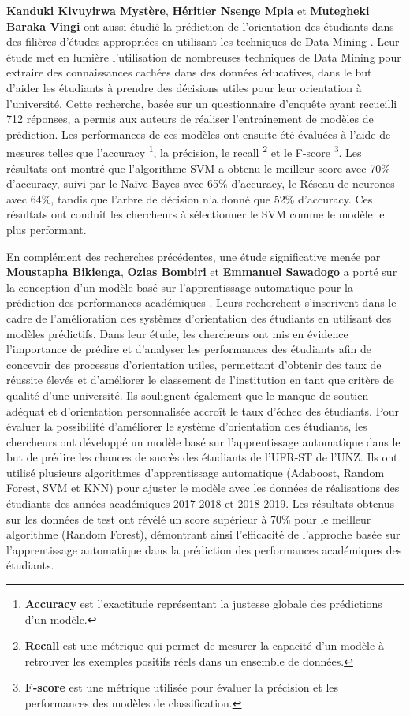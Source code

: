 \textbf{Kanduki Kivuyirwa Mystère}, \textbf{Héritier Nsenge Mpia} et \textbf{Mutegheki Baraka Vingi} ont aussi étudié la prédiction de l'orientation des étudiants dans des filières d’études appropriées en utilisant les techniques de Data Mining \cite{mystere2023prediction}. Leur étude met en lumière l'utilisation de nombreuses techniques de Data Mining pour extraire des connaissances cachées dans des données éducatives, dans le but d'aider les étudiants à prendre des décisions utiles pour leur orientation à l’université.
Cette recherche, basée sur un questionnaire d'enquête ayant recueilli 712 réponses, a permis aux auteurs de réaliser l'entraînement de modèles de prédiction. Les performances de ces modèles ont ensuite été évaluées à l'aide de mesures telles que l'accuracy \textsuperscript{} \footnote{\textbf{Accuracy} est l’exactitude représentant la justesse globale des prédictions d’un modèle.}, la précision, le recall \textsuperscript{} \footnote{\textbf{Recall} est une métrique qui permet de mesurer la capacité d’un modèle à retrouver les exemples positifs réels dans un ensemble de données.} et le F-score\textsuperscript{} \footnote{\textbf{F-score} est une métrique utilisée pour évaluer la précision et les performances des modèles de classification.}. Les résultats ont montré que l'algorithme SVM a obtenu le meilleur score avec 70\% d’accuracy, suivi par le Naïve Bayes avec 65\% d’accuracy, le Réseau de neurones avec 64\%, tandis que l’arbre de décision n'a donné que 52\% d’accuracy. Ces résultats ont conduit les chercheurs à sélectionner le SVM comme le modèle le plus performant.

En complément des recherches précédentes, une étude significative menée par \textbf{Moustapha Bikienga}, \textbf{Ozias Bombiri} et \textbf{Emmanuel Sawadogo} a porté sur la conception d'un modèle basé sur l'apprentissage automatique pour la prédiction des performances académiques \cite{bikienga2023design}. Leurs recherchent s'inscrivent dans le cadre de l'amélioration des systèmes d'orientation des étudiants en utilisant des modèles prédictifs.
Dans leur étude, les chercheurs ont mis en évidence l'importance de prédire et d'analyser les performances des étudiants afin de concevoir des processus d'orientation utiles, permettant d'obtenir des taux de réussite élevés et d'améliorer le classement de l'institution en tant que critère de qualité d'une université. Ils soulignent également que le manque de soutien adéquat et d'orientation personnalisée accroît le taux d'échec des étudiants.
Pour évaluer la possibilité d'améliorer le système d'orientation des étudiants, les chercheurs ont développé un modèle basé sur l'apprentissage automatique dans le but de prédire les chances de succès des étudiants de l'UFR-ST de l'UNZ. Ils ont utilisé plusieurs algorithmes d'apprentissage automatique (Adaboost, Random Forest, SVM et KNN) pour ajuster le modèle avec les données de réalisations des étudiants des années académiques 2017-2018 et 2018-2019.
Les résultats obtenus sur les données de test ont révélé un score supérieur à 70\% pour le meilleur algorithme (Random Forest), démontrant ainsi l'efficacité de l'approche basée sur l'apprentissage automatique dans la prédiction des performances académiques des étudiants.

